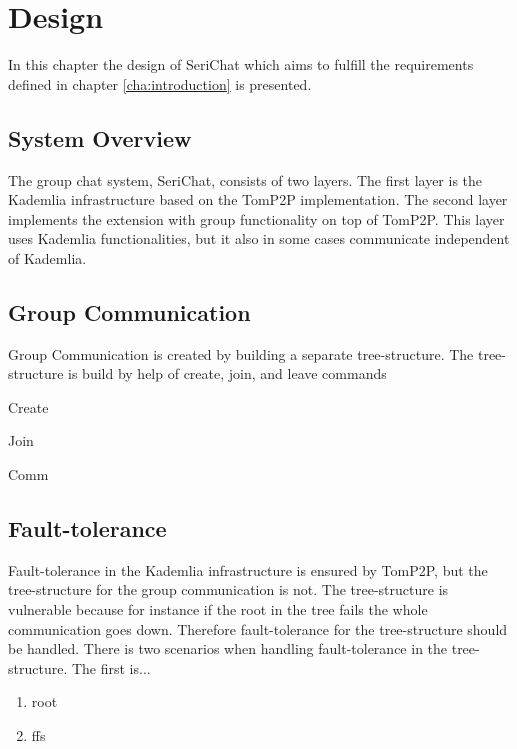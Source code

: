 \chapter{Design} \label{cha:design}
In this chapter the design of SeriChat which aims to fulfill the requirements defined in chapter \ref{cha:introduction} is presented.

\section{System Overview}
The group chat system, SeriChat, consists of two layers. The first layer is the Kademlia infrastructure based on the TomP2P implementation. The second layer implements the extension with group functionality on top of TomP2P. This layer uses Kademlia functionalities, but it also in some cases communicate independent of Kademlia. 

\section{Group Communication}
Group Communication is created by building a separate tree-structure. The tree-structure is build by help of create, join, and leave commands

Create

Join

Comm

\section{Fault-tolerance}
Fault-tolerance in the Kademlia infrastructure is ensured by TomP2P, but the tree-structure for the group communication is not. The tree-structure is vulnerable because for instance if the root in the tree fails the whole communication goes down. Therefore fault-tolerance for the tree-structure should be handled. There is two scenarios when handling fault-tolerance in the tree-structure. The first is... 
\begin{enumerate}
	\item root
	\item ffs
\end{enumerate}

